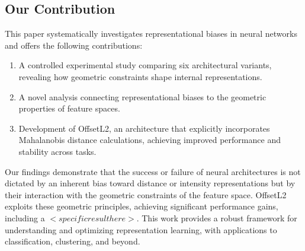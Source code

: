 \subsection{Our Contribution}

This paper systematically investigates representational biases in neural networks and offers the following contributions:

\begin{enumerate}
    \item A controlled experimental study comparing six architectural variants, revealing how geometric constraints shape internal representations.
    \item A novel analysis connecting representational biases to the geometric properties of feature spaces.
    \item Development of OffsetL2, an architecture that explicitly incorporates Mahalanobis distance calculations, achieving improved performance and stability across tasks.
\end{enumerate}

Our findings demonstrate that the success or failure of neural architectures is not dictated by an inherent bias toward distance or intensity representations but by their interaction with the geometric constraints of the feature space. OffsetL2 exploits these geometric principles, achieving significant performance gains, including a $<specific result here>$. This work provides a robust framework for understanding and optimizing representation learning, with applications to classification, clustering, and beyond.
